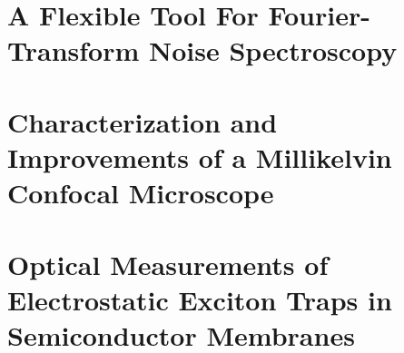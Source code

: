 \documentclass[
	a4paper, %
	fontsize=10pt, %
	twoside=false, %
	numbers=noenddot, %
	fontmethod=modern, %
	listing=minted
]{kaobook}
\begin{document}
\cleardoublepage\bigskip
\clearpage\bigskip


\cleardoublepage\bigskip
\clearpage\bigskip


\endgroup


\mainmatter %

% 

\part{A Flexible \python Tool For Fourier-Transform Noise Spectroscopy}
\label{part:speck}
\glsresetall %






\part{Characterization and Improvements of a Millikelvin Confocal Microscope}
\label{part:setup}
\glsresetall







\part{Optical Measurements of Electrostatic Exciton Traps in Semiconductor Membranes}
\label{part:exp}
\glsresetall






\end{document}
